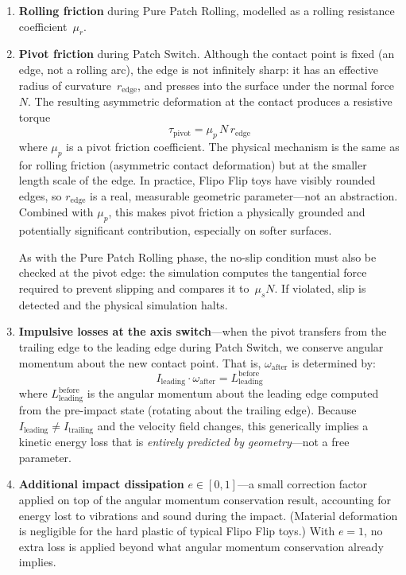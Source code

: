 \documentclass[11pt,a4paper]{article}
\newcommand{\leading}{\mathrm{leading}}
\newcommand{\trailing}{\mathrm{trailing}}
\begin{document}
\begin{enumerate}
  \item \textbf{Rolling friction} during Pure Patch Rolling, modelled as a rolling
        resistance coefficient~$\mu_r$.

  \item \textbf{Pivot friction} during Patch Switch.  Although the contact point is fixed
        (an edge, not a rolling arc), the edge is not infinitely sharp: it has an effective
        radius of curvature~$r_{\mathrm{edge}}$, and presses into the surface under the
        normal force~$N$.  The resulting asymmetric deformation at the contact produces a
        resistive torque
        \begin{equation}
          \tau_{\mathrm{pivot}} = \mu_p \, N \, r_{\mathrm{edge}}
        \end{equation}
        where $\mu_p$ is a pivot friction coefficient.  The physical mechanism is the same
        as for rolling friction (asymmetric contact deformation) but at the smaller length
        scale of the edge.  In practice, Flipo Flip toys have visibly rounded edges, so
        $r_{\mathrm{edge}}$ is a real, measurable geometric parameter---not an abstraction.
        Combined with $\mu_p$, this makes pivot friction a physically grounded and
        potentially significant contribution, especially on softer surfaces.

        As with the Pure Patch Rolling phase, the no-slip condition must also be checked at
        the pivot edge: the simulation computes the tangential force required to prevent
        slipping and compares it to~$\mu_s N$.  If violated, slip is detected and the
        physical simulation halts.

  \item \textbf{Impulsive losses at the axis switch}---when the pivot transfers from the
        trailing edge to the leading edge during Patch Switch, we conserve angular momentum
        about the new contact point.  That is, $\omega_{\mathrm{after}}$ is determined by:
        \begin{equation}
          I_{\leading}\cdot\omega_{\mathrm{after}}
            = L_{\leading}^{\mathrm{before}}
        \end{equation}
        where $L_{\leading}^{\mathrm{before}}$ is the angular momentum about the leading
        edge computed from the pre-impact state (rotating about the trailing edge).
        Because $I_{\leading}\neq I_{\trailing}$ and the velocity field changes, this
        generically implies a kinetic energy loss that is \emph{entirely predicted by
        geometry}---not a free parameter.

  \item \textbf{Additional impact dissipation} $e\in[0,1]$---a small correction factor
        applied on top of the angular momentum conservation result, accounting for energy
        lost to vibrations and sound during the impact.  (Material deformation is
        negligible for the hard plastic of typical Flipo Flip toys.)  With
        $e=1$, no extra loss is applied beyond what angular momentum conservation already
        implies.
\end{enumerate}
\end{document}
